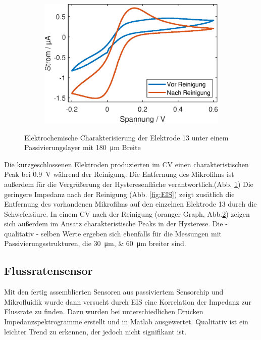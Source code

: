 \begin{figure}[!htb]
\begin{subfigure}[c]{0.31\linewidth}
\label{fig:CV_reinigung}
\end{subfigure}%
\hspace{4mm}
\begin{subfigure}[r]{0.31\linewidth}
\centering
\includegraphics[trim=0 0 0 0,clip,width=\linewidth]{plot/CV_180um.eps}
\label{fig:CV}
\end{subfigure}
\caption{Elektrochemische Charakterisierung der Elektrode 13 unter einem Passivierungslayer mit \SI{180}{\micro\meter} Breite}
\label{fig:180um_ElChem}
\end{figure}

Die kurzgeschlossenen Elektroden produzierten im CV einen charakteristischen Peak bei \SI{0.9}{\volt} während der Reinigung. Die Entfernung des Mikrofilms ist außerdem für die Vergrößerung der Hysteresenfläche verantwortlich.(Abb. \ref{fig:CV_reinigung})
Die geringere Impedanz nach der Reinigung (Abb. \ref{fig:EIS}) zeigt zusätlich die Entfernung des vorhandenen Mikrofilms auf den einzelnen Elektrode 13 durch die Schwefelsäure. In einem CV nach der Reinigung (oranger Graph, Abb.\ref{fig:CV}) zeigen sich außerdem im Ansatz charakteristische Peaks in der Hysterese. Die - qualitativ - selben Werte ergeben sich ebenfalls für die Messungen mit Passivierungsstrukturen, die \SIlist{30;60}{\micro\meter} breiter sind.

\subsection{Flussratensensor}
Mit den fertig assemblierten Sensoren aus passiviertem Sensorchip und Mikrofluidik wurde dann versucht durch EIS eine Korrelation der Impedanz zur Flussrate zu finden. Dazu wurden bei unterschiedlichen Drücken Impedanzspektrogramme erstellt und in Matlab ausgewertet. Qualitativ ist ein leichter Trend zu erkennen, der jedoch nicht signifikant ist. 

